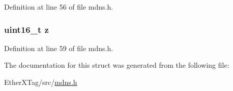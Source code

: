 Definition at line 56 of file mdns.\-h.

\hypertarget{structdns__flags__t_a72adab9ed2ad760c11fba6030575e111}{
\subsubsection[{z}]{\setlength{\rightskip}{0pt plus 5cm}uint16\-\_\-t z}}\label{structdns__flags__t_a72adab9ed2ad760c11fba6030575e111}


Definition at line 59 of file mdns.\-h.



The documentation for this struct was generated from the following file\-:\begin{DoxyCompactItemize}
\item 
Ether\-X\-Tag/src/\hyperlink{mdns_8h}{mdns.\-h}\end{DoxyCompactItemize}
